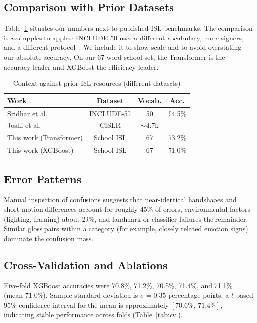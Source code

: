 \documentclass[conference]{IEEEtran}
\begin{document}
\subsection{Comparison with Prior Datasets}
Table~\ref{tab:compare} situates our numbers next to published ISL benchmarks. The comparison is \emph{not} apples-to-apples: INCLUDE-50 uses a different vocabulary, more signers, and a different protocol~\cite{sridhar2020}. We include it to show scale and to avoid overstating our absolute accuracy. On our 67-word school set, the Transformer is the accuracy leader and XGBoost the efficiency leader.

\begin{table}[t]
\centering
\caption{Context against prior ISL resources (different datasets)}
\label{tab:compare}
\begin{tabular}{@{}lccc@{}}
\toprule
Work & Dataset & Vocab. & Acc. \\
\midrule
Sridhar et al.~\cite{sridhar2020} & INCLUDE-50 & 50 & 94.5\% \\
Joshi et al.~\cite{joshi2022cislr} & CISLR & $\sim$4.7k & -- \\
This work (Transformer) & School ISL & 67 & 73.2\% \\
This work (XGBoost) & School ISL & 67 & 71.0\% \\
\bottomrule
\end{tabular}
\end{table}

\subsection{Error Patterns}
Manual inspection of confusions suggests that near-identical handshapes and short motion differences account for roughly 45\% of errors, environmental factors (lighting, framing) about 29\%, and landmark or classifier failures the remainder. Similar gloss pairs within a category (for example, closely related emotion signs) dominate the confusion mass.

\subsection{Cross-Validation and Ablations}
Five-fold XGBoost accuracies were 70.8\%, 71.2\%, 70.5\%, 71.4\%, and 71.1\% (mean 71.0\%). Sample standard deviation is $\sigma=0.35$ percentage points; a $t$-based 95\% confidence interval for the mean is approximately $[70.6\%,\,71.4\%]$, indicating stable performance across folds (Table~\ref{tab:cv}).
\end{document}
